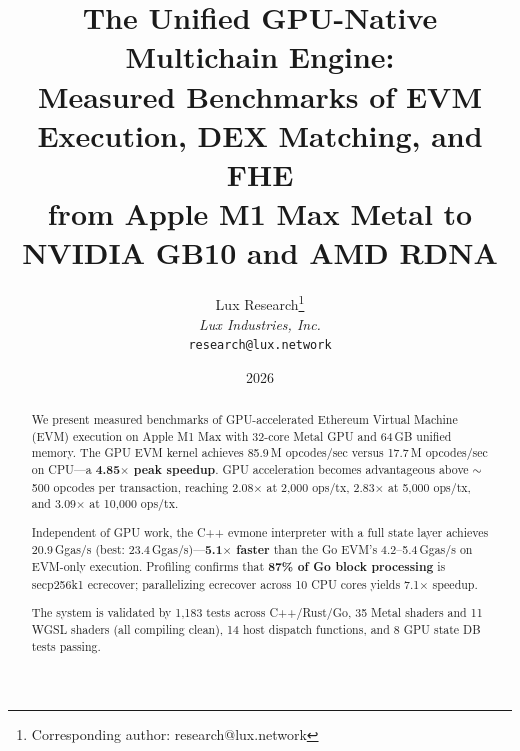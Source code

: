 \documentclass[11pt]{article}
\title{The Unified GPU-Native Multichain Engine:\\
Measured Benchmarks of EVM Execution, DEX Matching, and FHE\\
from Apple M1 Max Metal to NVIDIA GB10 and AMD RDNA}
\author{
Lux Research\thanks{Corresponding author: research@lux.network}\\
\textit{Lux Industries, Inc.}\\
\texttt{research@lux.network}
}
\date{2026}
\begin{document}
\luxcoverpage

\begin{abstract}
We present measured benchmarks of GPU-accelerated Ethereum Virtual Machine (EVM) execution
on Apple M1 Max with 32-core Metal GPU and 64\,GB unified memory. The GPU EVM kernel
achieves 85.9\,M opcodes/sec versus 17.7\,M opcodes/sec on CPU---a \textbf{4.85$\times$ peak speedup}.
GPU acceleration becomes advantageous above $\sim$500 opcodes per transaction, reaching
2.08$\times$ at 2{,}000 ops/tx, 2.83$\times$ at 5{,}000 ops/tx, and 3.09$\times$ at 10{,}000 ops/tx.

Independent of GPU work, the C++ evmone interpreter with a full state layer achieves
20.9\,Ggas/s (best: 23.4\,Ggas/s)---\textbf{5.1$\times$ faster} than the Go EVM's 4.2--5.4\,Ggas/s
on EVM-only execution. Profiling confirms that \textbf{87\% of Go block processing} is
secp256k1 ecrecover; parallelizing ecrecover across 10 CPU cores yields 7.1$\times$ speedup.

The system is validated by 1{,}183 tests across C++/Rust/Go, 35 Metal shaders and 11 WGSL
shaders (all compiling clean), 14 host dispatch functions, and 8 GPU state DB tests passing.


\end{abstract}
\end{document}
